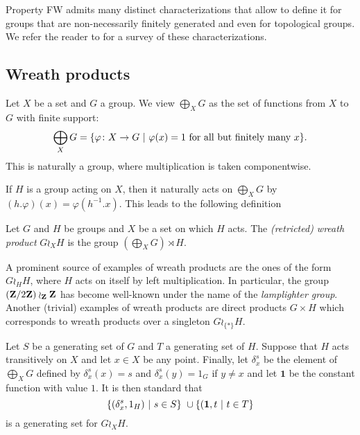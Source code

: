Property FW admits many distinct characterizations that allow to define it for groups that are non-necessarily finitely generated and even for topological groups. We refer the reader to \cite{Cornulier2013} for a survey of these characterizations.
%
%
%
%
%
%
%
%
%
%
\subsection{Wreath products}
%
%
%
%
%
Let $X$ be a set and $G$ a group. We view 
$\bigoplus_XG$ as the set of functions from $X$ to $G$ with finite support:
\[
	\bigoplus_XG=\{\varphi\colon X\to G\ |\ \varphi(x)=1 \textnormal{ for all but finitely many }x\}.
\]
This is naturally a group, where multiplication is taken componentwise.

If $H$ is a group acting on $X$, then it naturally acts on $\bigoplus_XG$
by $(h.\varphi)(x)=\varphi(h^{-1}.x)$.
This leads to the following definition
\begin{defn}\label{Def:WreathProd}
Let $G$ and $H$ be groups and $X$ be a set on which $H$ acts.
The \emph{(retricted) wreath product} $G\wr_XH$ is the group $(\bigoplus_XG)\rtimes H$.
\end{defn}
A prominent  source of examples of wreath products are the ones of the form $G\wr_HH$, where $H$ acts on itself by left multiplication.
In particular, the group $(\mathbf{Z}/2\mathbf{Z})\wr_{\mathbf{Z}}\mathbf{Z}$ has become well-known under the name of the \emph{lamplighter group}.
Another (trivial) examples of wreath products are direct products $G\times H$ which corresponds to wreath products over a singleton $G\wr_{\{*\}}H$.

Let $S$ be a generating set of $G$ and $T$ a generating set of $H$.
Suppose that $H$ acts transitively on $X$ and let $x\in X$ be any point.
Finally, let $\delta_x^s$ be the element of $\bigoplus_XG$ defined by $\delta_x^s(x)=s$ and $\delta_x^s(y)=1_G$ if $y\neq x$ and let $\mathbf 1$ be the constant function with value $1$.
It is then standard that 
\[
	\setst{(\delta_x^s,1_H)}{s \in S} \cup \setst{(\mathbf 1,t}{t \in T}
\]
is a generating set for $G\wr_XH$.

